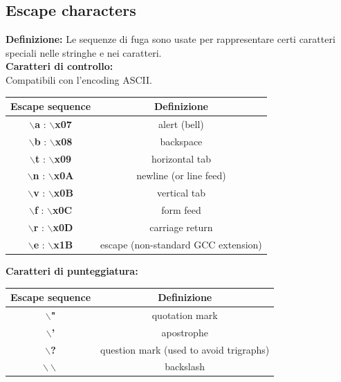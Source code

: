 \subsection{Escape characters}

\textsf{\small \textbf{Definizione: } Le sequenze di fuga sono usate per rappresentare certi caratteri speciali nelle stringhe e nei caratteri. } \\

\textbf{Caratteri di controllo: } \\

\textsf{\small Compatibili con l'encoding ASCII.} \\


\begin{tabular}{|c|c|}
	\hline
	\textbf{Escape sequence} & \textbf{Definizione} \\
	\hline
	\textsf{\small \textbf{$\backslash$a} : \textbf{$\backslash$x07}} & \textsf{\small alert (bell)} \\
	\hline
	\textsf{\small \textbf{$\backslash$b} : \textbf{$\backslash$x08}} & \textsf{\small backspace} \\
	\hline
	\textsf{\small \textbf{$\backslash$t} : \textbf{$\backslash$x09}} & \textsf{\small horizontal tab} \\
	\hline
	\textsf{\small \textbf{$\backslash$n} : \textbf{$\backslash$x0A}} & \textsf{\small newline (or line feed)} \\
	\hline
	\textsf{\small \textbf{$\backslash$v} : \textbf{$\backslash$x0B}} & \textsf{\small vertical tab} \\
	\hline
	\textsf{\small \textbf{$\backslash$f} : \textbf{$\backslash$x0C}} & \textsf{\small form feed} \\
	\hline
	\textsf{\small \textbf{$\backslash$r} : \textbf{$\backslash$x0D}} & \textsf{\small carriage return} \\
	\hline
	\textsf{\small \textbf{$\backslash$e} : \textbf{$\backslash$x1B}} & \textsf{\small escape (non-standard GCC extension)} \\
	\hline
\end{tabular} \break

\textbf{Caratteri di punteggiatura: } \\

\begin{tabular}{|c|c|}
	\hline
	\textbf{Escape sequence} & \textbf{Definizione} \\
	\hline
	\textsf{\small \textbf{$\backslash$"}} & \textsf{\small quotation mark} \\
	\hline
	\textsf{\small \textbf{$\backslash$'}} & \textsf{\small apostrophe} \\
	\hline
	\textsf{\small \textbf{$\backslash$?}} & \textsf{\small question mark (used to avoid trigraphs)} \\
	\hline
	\textsf{\small \textbf{$\backslash\backslash$}} & \textsf{\small backslash} \\
	\hline
\end{tabular} \break


